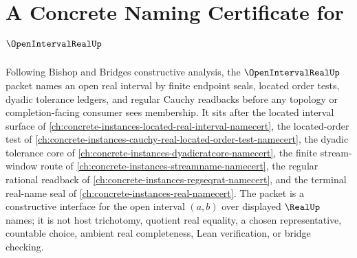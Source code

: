 \chapter{A Concrete Naming Certificate for $\OpenIntervalRealUp$}
\label{ch:concrete-instances-open-interval-real-namecert}

Following Bishop and Bridges constructive analysis, the $\OpenIntervalRealUp$ packet names an open real interval by finite endpoint seals, located order tests, dyadic tolerance ledgers, and regular Cauchy readbacks before any topology or completion-facing consumer sees membership. It sits after the located interval surface of \autoref{ch:concrete-instances-located-real-interval-namecert}, the located-order test of \autoref{ch:concrete-instances-cauchy-real-located-order-test-namecert}, the dyadic tolerance core of \autoref{ch:concrete-instances-dyadicratcore-namecert}, the finite stream-window route of \autoref{ch:concrete-instances-streamname-namecert}, the regular rational readback of \autoref{ch:concrete-instances-regseqrat-namecert}, and the terminal real-name seal of \autoref{ch:concrete-instances-real-namecert}. The packet is a constructive interface for the open interval $(a,b)$ over displayed $\RealUp$ names; it is not host trichotomy, quotient real equality, a chosen representative, countable choice, ambient real completeness, Lean verification, or bridge checking.

